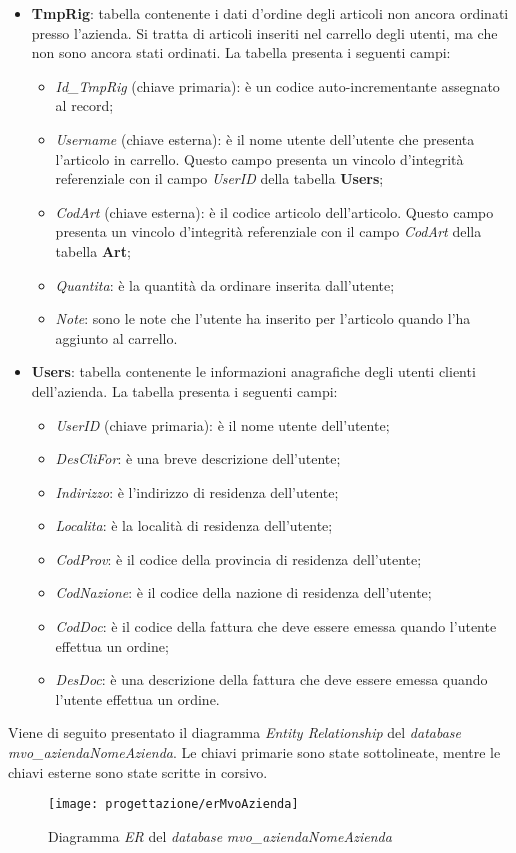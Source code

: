 \begin{itemize}
	\item \textbf{TmpRig}: tabella contenente i dati d'ordine degli articoli non ancora ordinati presso l'azienda. Si tratta di articoli inseriti nel carrello degli utenti, ma che non sono ancora stati ordinati. La tabella presenta i seguenti campi:
		\begin{itemize}
			\item \textit{Id\_TmpRig} (chiave primaria): è un codice auto-incrementante assegnato al record;
			\item \textit{Username} (chiave esterna): è il nome utente dell'utente che presenta l'articolo in carrello. Questo campo presenta un vincolo d'integrità referenziale con il campo \textit{UserID} della tabella \textbf{Users};
			\item \textit{CodArt} (chiave esterna): è il codice articolo dell'articolo. Questo campo presenta un vincolo d'integrità referenziale con il campo \textit{CodArt} della tabella \textbf{Art};
			\item \textit{Quantita}: è la quantità da ordinare inserita dall'utente;
			\item \textit{Note}: sono le note che l'utente ha inserito per l'articolo quando l'ha aggiunto al carrello.
		\end{itemize}
	\item \textbf{Users}: tabella contenente le informazioni anagrafiche degli utenti clienti dell'azienda. La tabella presenta i seguenti campi:
		\begin{itemize}
			\item \textit{UserID} (chiave primaria): è il nome utente dell'utente;
			\item \textit{DesCliFor}: è una breve descrizione dell'utente;
			\item \textit{Indirizzo}: è l'indirizzo di residenza dell'utente;
			\item \textit{Localita}: è la località di residenza dell'utente;
			\item \textit{CodProv}: è il codice della provincia di residenza dell'utente;
			\item \textit{CodNazione}: è il codice della nazione di residenza dell'utente;
			\item \textit{CodDoc}: è il codice della fattura che deve essere emessa quando l'utente effettua un ordine;
			\item \textit{DesDoc}: è una descrizione della fattura che deve essere emessa quando l'utente effettua un ordine.
		\end{itemize}
\end{itemize}
Viene di seguito presentato il diagramma \textit{Entity Relationship} del \textit{database} \textit{mvo\_aziendaNomeAzienda}. Le chiavi primarie sono state sottolineate, mentre le chiavi esterne sono state scritte in corsivo.

\begin{figure}[!h] 
    \centering 
    \texttt{[image: progettazione/erMvoAzienda]} 
    \caption{Diagramma \textit{ER} del \textit{database} \textit{mvo\_aziendaNomeAzienda}}
\end{figure}

